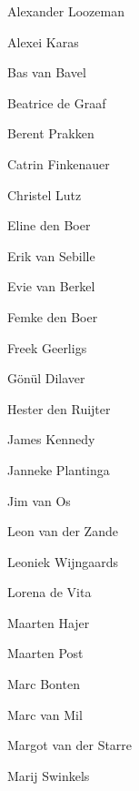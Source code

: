 \documentclass[smallauthor, chapterhaspagenum, nochapterinheader, pagenuminheader,  bigchapnum,medium2, tocpages, garamond, titleinheader]{jote-book}
\begin{document}
	\begin{references}


		Alexander Loozeman

		Alexei Karas



		Bas van Bavel



		Beatrice de Graaf



		Berent Prakken



		Catrin Finkenauer



		Christel Lutz



		Eline den Boer



		Erik van Sebille



		Evie van Berkel



		Femke den Boer



		Freek Geerligs



		Gönül Dilaver



		Hester den Ruijter



		James Kennedy



		Janneke Plantinga



		Jim van Os



		Leon van der Zande



		Leoniek Wijngaards



		Lorena de Vita



		Maarten Hajer



		Maarten Post



		Marc Bonten



		Marc van Mil



		Margot van der Starre



		Marij Swinkels




\end{references}
\end{document}
